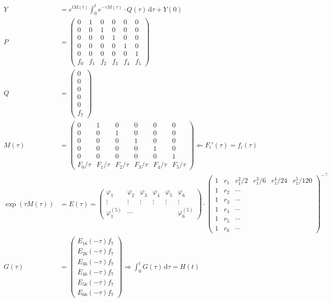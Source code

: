 \documentclass[12pt]{article}
\begin{document}
\begin{align}
Y &= e^{tM(t)} \int_0^t e^{-\tau M(\tau)}\cdot Q(\tau)\,\mathrm{d}\tau + Y(0) \\
P &= \begin{pmatrix} 0 & 1 & 0 & 0 & 0 & 0 \\ 0 & 0 & 1 & 0 & 0 & 0 \\ 0 & 0 & 0 & 1 & 0 & 0 \\ 0 & 0 & 0 & 0 & 1 & 0 \\ 0 & 0 & 0 & 0 & 0 & 1 \\ f_0 & f_1 & f_2 & f_3 & f_4 & f_5 \end{pmatrix} \\
Q &= \begin{pmatrix} 0 \\ 0 \\ 0 \\ 0 \\ 0 \\ f_7 \end{pmatrix} \\
M(\tau) &= \begin{pmatrix} 0 & 1 & 0 & 0 & 0 & 0 \\ 0 & 0 & 1 & 0 & 0 & 0 \\ 0 & 0 & 0 & 1 & 0 & 0 \\ 0 & 0 & 0 & 0 & 1 & 0 \\ 0 & 0 & 0 & 0 & 0 & 1 \\ F_0/\tau & F_1/\tau & F_2/\tau & F_3/\tau & F_4/\tau & F_5/\tau \end{pmatrix} \Leftarrow F_i'(\tau) = f_i(\tau) \\
\exp (\tau M(\tau)) &= E(\tau) = \begin{pmatrix} \varphi_1 & \varphi_2 & \varphi_3 & \varphi_4 & \varphi_5 & \varphi_6 \\ \vdots & \vdots & \vdots & \vdots & \vdots & \vdots \\ \varphi_1^{(5)} & \cdots &  &  &  & \varphi_6^{(5)} \end{pmatrix} \cdot \begin{pmatrix} 1 & r_1 & r_1^2/2 & r_1^3/6 & r_1^4/24 & r_1^5/120 \\ 1 & r_2 & \cdots \\ 1 & r_3 & \cdots \\ 1 & r_4 & \cdots \\ 1 & r_5 & \cdots \\ 1 & r_6 & \cdots \end{pmatrix}^{-\top} \\
G(\tau) &= \begin{pmatrix} E_{16}(-\tau) f_7 \\ E_{26}(-\tau) f_7 \\ E_{36}(-\tau) f_7 \\ E_{46}(-\tau) f_7 \\ E_{56}(-\tau) f_7 \\ E_{66}(-\tau) f_7 \end{pmatrix} \Rightarrow \int_0^t G(\tau)\,\mathrm{d}\tau = H(t) \\

\end{align}
\end{document}
